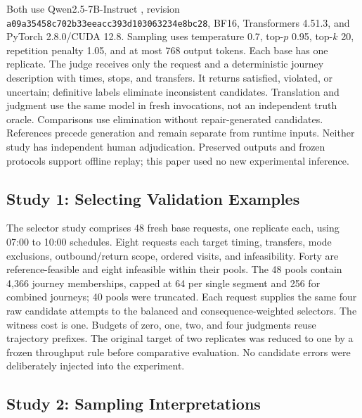 \documentclass[a4paper,twoside]{article}
\begin{document}
Both use Qwen2.5-7B-Instruct \cite{qwen}, revision \texttt{a09a35458c702b33eeac\allowbreak{}c393d103063234e8bc28}, BF16, Transformers 4.51.3, and PyTorch 2.8.0/CUDA 12.8. Sampling uses temperature 0.7, top-$p$ 0.95, top-$k$ 20, repetition penalty 1.05, and at most 768 output tokens. Each base has one replicate.
The judge receives only the request and a deterministic journey description with times, stops, and transfers. It returns satisfied, violated, or uncertain; definitive labels eliminate inconsistent candidates. Translation and judgment use the same model in fresh invocations, not an independent truth oracle. Comparisons use elimination without repair-generated candidates.
References precede generation and remain separate from runtime inputs. Neither study has independent human adjudication. Preserved outputs and frozen protocols support offline replay; this paper used no new experimental inference.

\subsection{Study 1: Selecting Validation Examples}

The selector study comprises 48 fresh base requests, one replicate each, using 07:00 to 10:00 schedules. Eight requests each target timing, transfers, mode exclusions, outbound/return scope, ordered visits, and infeasibility. Forty are reference-feasible and eight infeasible within their pools. The 48 pools contain 4,366 journey memberships, capped at 64 per single segment and 256 for combined journeys; 40 pools were truncated.
Each request supplies the same four raw candidate attempts to the balanced and consequence-weighted selectors. The witness cost is one. Budgets of zero, one, two, and four judgments reuse trajectory prefixes. The original target of two replicates was reduced to one by a frozen throughput rule before comparative evaluation. No candidate errors were deliberately injected into the experiment.

\subsection{Study 2: Sampling Interpretations}
\end{document}
